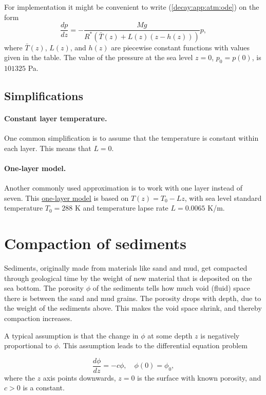 \documentclass[%
oneside,                 %
final,                   %
10pt]{article}
\begin{document}
\noindent
For implementation it might be convenient to write (\ref{decay:app:atm:ode})
on the form
\begin{equation}
\frac{dp}{dz} = -\frac{Mg}{R^*(\bar T(z) + L(z)(z-h(z)))} p,
\end{equation}
where $\bar T(z)$, $L(z)$, and $h(z)$ are piecewise constant
functions with values given in the table.
The value of the pressure at the sea level $z=0$, $p_0=p(0)$, is $101325$ Pa.

\subsection{Simplifications}

\paragraph{Constant layer temperature.}
One common simplification is to assume that the temperature is
constant within each layer. This means that $L=0$.

\paragraph{One-layer model.}
Another commonly used approximation is to work with one layer instead of
seven. This \href{{http://en.wikipedia.org/wiki/Density_of_air}}{one-layer model}
is based on $T(z)=T_0 - Lz$, with
sea level standard temperature $T_0=288$ K and
temperature lapse rate $L=0.0065$ K/m.

\section{Compaction of sediments}
\label{decay:app:sediment}

Sediments, originally made from materials like sand and mud, get
compacted through geological time by the weight of new material that
is deposited on the sea bottom. The porosity $\phi$ of the sediments
tells how much void (fluid) space there is between the sand and
mud grains. The porosity drops with depth, due to the weight of
the sediments above. This makes the void space shrink, and thereby compaction
increases.

A typical assumption is that the change in $\phi$ at some depth $z$
is negatively proportional to $\phi$. This assumption leads to
the differential equation problem

\begin{equation}
\frac{d\phi}{dz} = -c\phi,\quad \phi(0)=\phi_0,
\label{decay:app:sediment:phi:eq}
\end{equation}
where the $z$ axis points downwards, $z=0$ is the surface with known
porosity, and $c>0$ is a constant.
\end{document}
